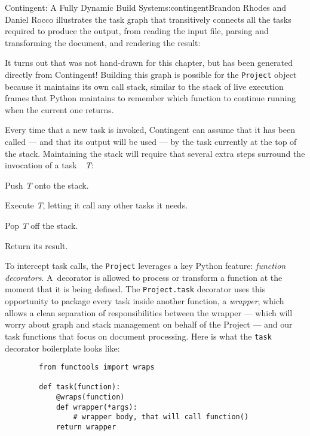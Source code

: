 \begin{aosachapter}{Contingent: A Fully Dynamic Build System}{s:contingent}{Brandon Rhodes and Daniel Rocco}
 illustrates the task graph that
transitively connects all the tasks required to produce the output, from
reading the input file, parsing and transforming the document, and
rendering the result:


It turns out that  was not hand-drawn
for this chapter, but has been generated directly from Contingent!
Building this graph is possible for the \texttt{Project} object because
it maintains its own call stack, similar to the stack of live execution
frames that Python maintains to remember which function to continue
running when the current one returns.

Every time that a new task is invoked, Contingent can assume that it has
been called --- and that its output will be used --- by the task
currently at the top of the stack. Maintaining the stack will require
that several extra steps surround the invocation of a task~~\emph{T}:

\begin{aosaenumerate}
\def\labelenumi{\arabic{enumi}.}

\item
  Push \emph{T} onto the stack.
\item
  Execute \emph{T}, letting it call any other tasks it needs.
\item
  Pop \emph{T} off the stack.
\item
  Return its result.
\end{aosaenumerate}

To intercept task calls, the \texttt{Project} leverages a key Python
feature: \emph{function decorators}. A~decorator is allowed to process
or transform a function at the moment that it is being defined. The
\texttt{Project.task} decorator uses this opportunity to package every
task inside another function, a \emph{wrapper}, which allows a clean
separation of responsibilities between the wrapper --- which will worry
about graph and stack management on behalf of the Project --- and our
task functions that focus on document processing. Here is what the
\texttt{task} decorator boilerplate looks like:

\begin{verbatim}
        from functools import wraps

        def task(function):
            @wraps(function)
            def wrapper(*args):
                # wrapper body, that will call function()
            return wrapper
\end{verbatim}


\end{aosachapter}
